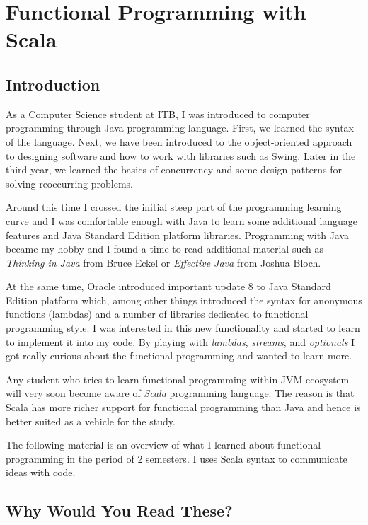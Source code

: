 \documentclass[12pt,twoside,a4paper]{report}
\begin{document}
\chapter{Functional Programming with Scala}\label{6}

\section{Introduction}\label{6.1}

As a Computer Science student at ITB, I was introduced to computer
programming through Java programming language. First, we learned the
syntax of the language. Next, we have been introduced to the
object-oriented approach to designing software and how to work with
libraries such as Swing. Later in the third year, we learned the basics
of concurrency and some design patterns for solving reoccurring
problems.

Around this time I crossed the initial steep part of the programming
learning curve and I was comfortable enough with Java to learn some
additional language features and Java Standard Edition platform
libraries. Programming with Java became my hobby and I found a time to
read additional material such as \emph{Thinking in Java} from Bruce Eckel or
\emph{Effective Java} from Joshua Bloch.

At the same time, Oracle introduced important update 8 to Java Standard
Edition platform which, among other things introduced the syntax for
anonymous functions (lambdas) and a number of libraries dedicated to
functional programming style. I was interested in this new functionality
and started to learn to implement it into my code. By playing with
\emph{lambdas}, \emph{streams}, and \emph{optionals} I got really curious about the
functional programming and wanted to learn more.

Any student who tries to learn functional programming within JVM
ecosystem will very soon become aware of \emph{Scala} programming language.
The reason is that Scala has more richer support for functional
programming than Java and hence is better suited as a vehicle for the
study.

The following material is an overview of what I learned about functional
programming in the period of 2 semesters. I uses Scala syntax to
communicate ideas with code.

\section{Why Would You Read These?}\label{6.2}
\end{document}
